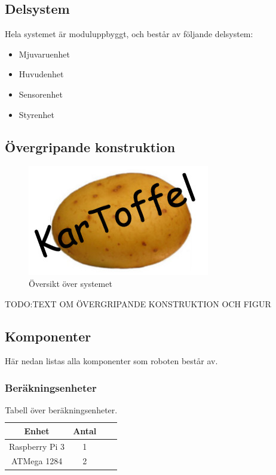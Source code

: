 \documentclass{article}
\begin{document}
\subsection{Delsystem}
Hela systemet är moduluppbyggt, och består av följande delsystem:
\begin{itemize}
\item Mjuvaruenhet
\item Huvudenhet
\item Sensorenhet
\item Styrenhet
\end{itemize}

\subsection{Övergripande konstruktion}
\begin{figure}[H]
\centering
\includegraphics[scale=0.4]{Logo}
\caption{Översikt över systemet}
\label{fig:oversikt_systemet3}
\end{figure}

TODO:TEXT OM ÖVERGRIPANDE KONSTRUKTION OCH FIGUR

\subsection{Komponenter}
Här nedan listas alla komponenter som roboten består av.

\subsubsection{Beräkningsenheter}
\begin{table}[H]
  \centering
  \begin{tabular}{ | c | c | c | c |}
    \hline
    \textbf{Enhet} & \textbf{Antal} \\
    \hline
    Raspberry Pi 3 & 1 \\
    \hline
    ATMega 1284 & 2 \\
    \hline
  \end{tabular}
  \caption{ Tabell över beräkningsenheter. }
\end{table}
\end{document}
